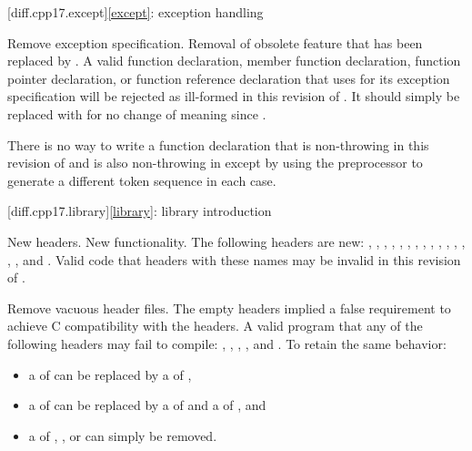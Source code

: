 [diff.cpp17.except]{\ref{except}: exception handling}

\change
Remove  exception specification.
\rationale
Removal of obsolete feature that has been replaced by .
\effect
A valid \CppXVII{} function declaration, member function declaration, function
pointer declaration, or function reference declaration that uses 
for its exception specification will be rejected as ill-formed in this
revision of \Cpp{}. It should simply be replaced with  for no
change of meaning since \CppXVII{}.
\begin{note}
There is no way to write a function declaration
that is non-throwing in this revision of \Cpp{}
and is also non-throwing in \CppIII{}
except by using the preprocessor to generate
a different token sequence in each case.
\end{note}

[diff.cpp17.library]{\ref{library}: library introduction}

\change
New headers.
\rationale
New functionality.
\effect
The following \Cpp{} headers are new:
,
,
,
,
,
,
,
,
,
,
,
,
,
,
, and
.
Valid \CppXVII{} code that  headers with these names may be
invalid in this revision of \Cpp{}.

\change
Remove vacuous \Cpp{} header files.
\rationale
The empty headers implied a false requirement to achieve C compatibility with the \Cpp{} headers.
\effect
A valid \CppXVII{} program that  any of the following headers may fail to compile:
,
,
,
, and
.
To retain the same behavior:
\begin{itemize}
\item
a  of  can be replaced by
a  of ,
\item
a  of  can be replaced by
a  of  and
a  of ,
and
\item
a  of
,
, or
can simply be removed.
\end{itemize}

